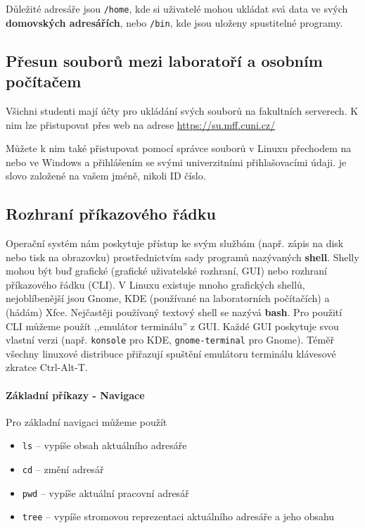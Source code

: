 Důležité adresáře jsou \verb|/home|, kde si uživatelé mohou ukládat svá data ve svých \textbf{domovských adresářích}, nebo \verb|/bin|, kde jsou uloženy spustitelné programy.

\subsection{Přesun souborů mezi laboratoří a osobním počítačem}

Všichni studenti mají účty pro ukládání svých souborů na fakultních serverech. K nim lze přistupovat přes web na adrese \url{https://su.mff.cuni.cz/}

Můžete k nim také přistupovat pomocí správce souborů v Linuxu přechodem na  nebo  ve Windows a přihlášením se svými univerzitními přihlašovacími údaji.  je slovo založené na vašem jméně, nikoli ID číslo.

\subsection{Rozhraní příkazového řádku}

Operační systém nám poskytuje přístup ke svým službám (např. zápis na disk nebo tisk na obrazovku) prostřednictvím sady programů nazývaných \textbf{shell}. Shelly mohou být buď grafické (grafické uživatelské rozhraní, GUI) nebo rozhraní příkazového řádku (CLI). V Linuxu existuje mnoho
grafických shellů, nejoblíbenější jsou Gnome, KDE (používané na laboratorních počítačích) a (hádám) Xfce. Nejčastěji používaný textový shell se nazývá \textbf{bash}. Pro použití CLI můžeme použít ,,emulátor terminálu'' z GUI. Každé GUI poskytuje svou vlastní verzi
(např. \verb|konsole| pro KDE, \verb|gnome-terminal| pro Gnome). Téměř všechny linuxové distribuce přiřazují spuštění emulátoru terminálu klávesové zkratce Ctrl-Alt-T.

\paragraph{Základní příkazy - Navigace}

Pro základní navigaci můžeme použít

\begin{itemize}
  \item
    \verb|ls| -- vypíše obsah aktuálního adresáře
  \item
    \verb|cd| -- změní adresář
  \item
    \verb|pwd| -- vypíše aktuální pracovní adresář
  \item
    \verb|tree| -- vypíše stromovou reprezentaci aktuálního
    adresáře a jeho obsahu
\end{itemize}

